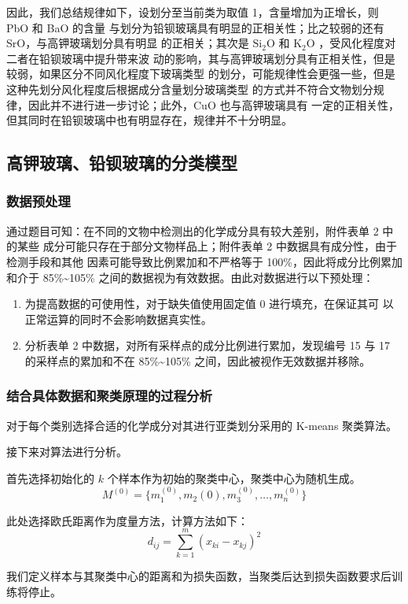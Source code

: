 \documentclass[withoutpreface,bwprint]{cumcmthesis} %
\begin{document}
因此，我们总结规律如下，设划分至当前类为取值 1，含量增加为正增长，则 PbO 和 BaO 的含量
与划分为铅钡玻璃具有明显的正相关性；比之较弱的还有 SrO，与高钾玻璃划分具有明显
的正相关；其次是 $\mathrm{Si_2O}$ 和 $\mathrm{K_2O}$ ，受风化程度对二者在铅钡玻璃中提升带来波
动的影响，其与高钾玻璃划分具有正相关性，但是较弱，如果区分不同风化程度下玻璃类型
的划分，可能规律性会更强一些，但是这种先划分风化程度后根据成分含量划分玻璃类型
的方式并不符合文物划分规律，因此并不进行进一步讨论；此外，CuO 也与高钾玻璃具有
一定的正相关性，但其同时在铅钡玻璃中也有明显存在，规律并不十分明显。

\subsection{高钾玻璃、铅钡玻璃的分类模型}
\subsubsection{数据预处理}
通过题目可知：在不同的文物中检测出的化学成分具有较大差别，附件表单 2 中的某些
成分可能只存在于部分文物样品上；附件表单 2 中数据具有成分性，由于检测手段和其他
因素可能导致比例累加和不严格等于 100\%，因此将成分比例累加和介于 85\%\~{}105\%
之间的数据视为有效数据。由此对数据进行以下预处理：
\begin{enumerate}
    \item 为提高数据的可使用性，对于缺失值使用固定值 0 进行填充，在保证其可
          以正常运算的同时不会影响数据真实性。
    \item 分析表单 2 中数据，对所有采样点的成分比例进行累加，发现编号 15 与
          17 的采样点的累加和不在 85\%\~{}105\% 之间，因此被视作无效数据并移除。
\end{enumerate}

\subsubsection{结合具体数据和聚类原理的过程分析}
对于每个类别选择合适的化学成分对其进行亚类划分采用的 K-means 聚类算法。

接下来对算法进行分析。

首先选择初始化的 $k$ 个样本作为初始的聚类中心，聚类中心为随机生成。
\[
    M^{(0)}=\{m_1^{(0)},m_2{(0)},m_3^{(0)},\dots,m_n^{(0)}\}
\]

此处选择欧氏距离作为度量方法，计算方法如下：
\[
    d_{ij}=\sum_{k=1}^m(x_{ki}-x_{kj})^2
\]

我们定义样本与其聚类中心的距离和为损失函数，当聚类后达到损失函数要求后训
练将停止。
\end{document}
